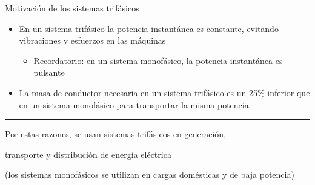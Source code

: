 \documentclass[aspectratio=169, usenames,svgnames,dvipsnames]{beamer}
\begin{document}
\begin{frame}{Motivación de los sistemas trifásicos}

    \vspace{8mm}
    \begin{itemize}
    \item En un sistema trifásico la \alert{potencia instantánea es constante}, evitando vibraciones y esfuerzos en las máquinas 

    \vspace{2mm}
    \begin{itemize}
        \item \normalsize \alert{Recordatorio}: en un sistema monofásico, la potencia instantánea es pulsante
    \end{itemize}    

    \vspace{6mm}
    \item La \alert{masa de conductor necesaria} en un sistema trifásico \alert{es un 25\% inferior} que en un sistema monofásico para transportar la misma potencia
    \end{itemize}

    \vspace{2mm}
    
    \noindent\rule{\textwidth}{0.5pt}

    \vspace{2mm}

    \begin{center}
        Por estas razones, se usan sistemas trifásicos en \alert{generación,} 

        \vspace{-2mm}
        \alert{transporte y distribución de energía eléctrica}

        \vspace{1mm}
        \small{(los sistemas monofásicos se utilizan en cargas domésticas y de baja potencia)}
    \end{center}    
\end{frame}

\end{document}
